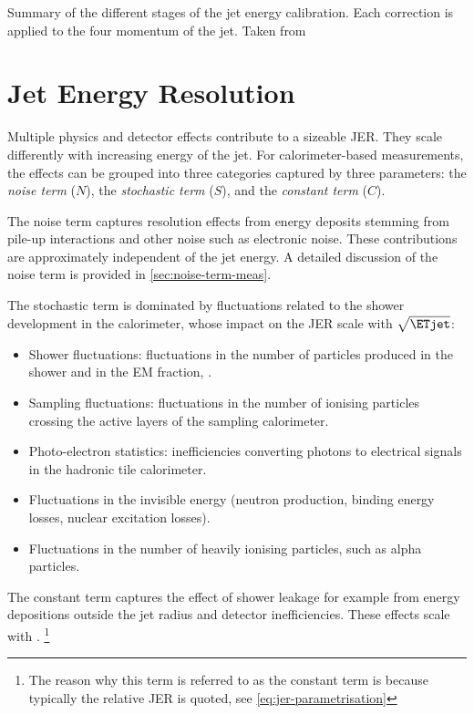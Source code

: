 

\begin{table}
    \caption{Summary of the different stages of the jet energy calibration. Each correction is applied to the four momentum of the jet. Taken from }
    \label{tab:jes-calibration}
\end{table}


\section{Jet Energy Resolution}
Multiple physics and detector effects contribute to a sizeable JER. They scale differently with increasing energy of the jet. For calorimeter-based measurements, the effects can be grouped into three categories captured by three parameters: the \emph{noise term} ($N$), the \emph{stochastic term} ($S$), and the \emph{constant term} ($C$). 

The noise term captures resolution effects from energy deposits stemming from pile-up interactions and other noise such as electronic noise. These contributions are approximately independent of the jet energy. A detailed discussion of the noise term is provided in \cref{sec:noise-term-meas}.

The stochastic term is dominated by fluctuations related to the shower development in the calorimeter, whose impact on the JER scale with $\sqrt{\ETjet}$:
\begin{itemize}
    \item Shower fluctuations: fluctuations in the number of particles produced in the shower and in the EM fraction, \fEM.
    \item Sampling fluctuations: fluctuations in the number of ionising particles crossing the active layers of the sampling calorimeter.
    \item Photo-electron statistics: inefficiencies converting photons to electrical signals in the hadronic tile calorimeter.
    \item Fluctuations in the invisible energy (neutron production, binding energy losses, nuclear excitation losses).
    \item Fluctuations in the number of heavily ionising particles, such as alpha particles.
\end{itemize}
The constant term captures the effect of shower leakage for example from energy depositions outside the jet radius and detector inefficiencies. These effects scale with \ETjet. \footnote{The reason why this term is referred to as the constant term is because typically the relative JER is quoted, see \cref{eq:jer-parametrisation}} 


